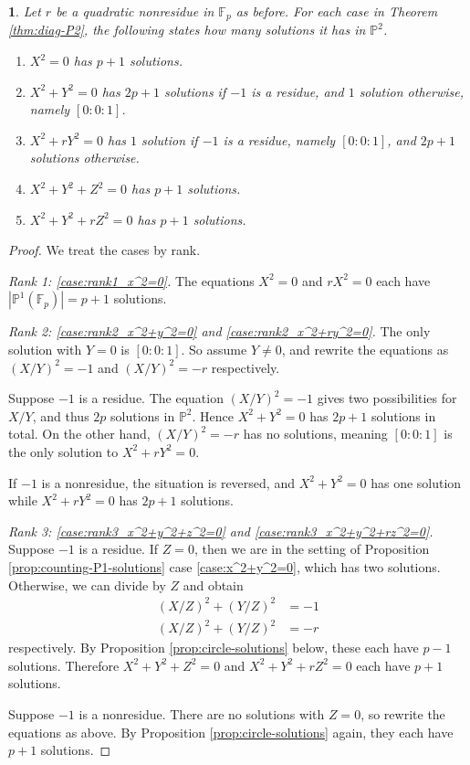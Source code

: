 \documentclass[10pt,a4paper]{amsart}
\numberwithin{equation}{section}
\numberwithin{figure}{section}
\theoremstyle{definition}
\theoremstyle{plain}
\theoremstyle{remark}
\theoremstyle{plain}
\theoremstyle{definition}
\theoremstyle{plain}
\newtheorem{prop}[thm]{\protect\propositionname}
\theoremstyle{plain}
\providecommand{\propositionname}{Proposition}
\renewcommand{\P}{\mathbb{P}}
\newcommand{\F}{\mathbb{F}}
\begin{document}
	\begin{prop}\label{prop:counting-P2-solutions}
		Let $r$ be a quadratic nonresidue in $\F_p$ as before. For each case in Theorem \ref{thm:diag-P2}, the following states how many solutions it has in $\P^2$. 
		\begin{enumerate} 
			\item\label{case:rank1_x^2=0} $X^2 = 0$ has $p+1$ solutions.
			\item\label{case:rank2_x^2+y^2=0} $X^2 + Y^2 = 0$ has $2p+1$ solutions if $-1$ is a residue, and $1$ solution otherwise, namely $[0:0:1]$.
			\item\label{case:rank2_x^2+ry^2=0} $X^2 + rY^2 = 0$ has $1$ solution if $-1$ is a residue, namely $[0:0:1]$, and $2p+1$ solutions otherwise.
			\item\label{case:rank3_x^2+y^2+z^2=0} $X^2 + Y^2 + Z^2 = 0$ has $p+1$ solutions.
			\item\label{case:rank3_x^2+y^2+rz^2=0} $X^2 + Y^2 + rZ^2 = 0$ has $p+1$ solutions.
		\end{enumerate}
	\end{prop}
	\begin{proof} We treat the cases by rank.
		
		\textit{Rank 1: \eqref{case:rank1_x^2=0}.} 
		The equations $X^2 = 0$ and $rX^2 = 0$ each have $|\P^1(\F_p)|=p + 1$ solutions.
		
		\textit{Rank 2: \eqref{case:rank2_x^2+y^2=0} and \eqref{case:rank2_x^2+ry^2=0}.} 
		The only solution with $Y=0$ is $[0:0:1]$. So assume $Y \neq 0$, and rewrite the 
		equations as $(X/Y)^2 = -1$ and $(X/Y)^2 = -r$ respectively.
		
		Suppose $-1$ is a residue. The equation $(X/Y)^2 = -1$ gives
		two possibilities for $X/Y$, and thus $2p$ solutions in $\mathbb{P}^2$. Hence
		$X^2 + Y^2 = 0$ has $2p + 1$ solutions in total. On the other hand, $(X/Y)^2 =
		-r$ has no solutions, meaning $[0:0:1]$ is the only solution to $X^2 + rY^2 =
		0$.
		
		If $-1$ is a nonresidue, the situation is reversed, and $X^2 + Y^2 = 0$ has one
		solution while $X^2 + rY^2 = 0$ has $2p + 1$ solutions.
		
		\textit{Rank 3: \eqref{case:rank3_x^2+y^2+z^2=0} and \eqref{case:rank3_x^2+y^2+rz^2=0}.} 
		Suppose $-1$ is a residue. If $Z = 0$, then we are in the setting of
		Proposition \ref{prop:counting-P1-solutions} case \eqref{case:x^2+y^2=0}, which has two
		solutions. Otherwise, we can divide by $Z$ and obtain 
		\begin{align*} 
		(X/Z)^2 + (Y/Z)^2 &= -1 \\ 
		(X/Z)^2 + (Y/Z)^2 &= -r 
		\end{align*} 
		respectively. By Proposition \ref{prop:circle-solutions} below, these each have $p - 1$
		solutions. Therefore $X^2 + Y^2 + Z^2 = 0$ and $X^2 + Y^2 + rZ^2 = 0$ each have
		$p+1$ solutions.
		
		Suppose $-1$ is a nonresidue. There are no solutions with $Z=0$, so rewrite the
		equations as above. By Proposition \ref{prop:circle-solutions} again, they each
		have $p + 1$ solutions.
	\end{proof}
\end{document}
